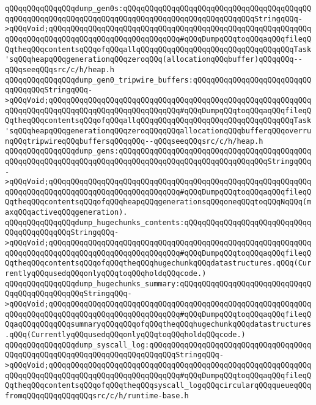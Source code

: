 \verb|qQQqqQQqqQQqqQQqdump_gen0s:qQQqqQQqqQQqqQQqqQQqqQQqqQQqqQQqqQQqqQQqqQQqqQQqqQQqqQQqqQQqqQQqqQQqqQQqqQQqqQQqqQQqqQQqqQQqqQQqqQQqStringqQQq->qQQqVoid;qQQqqQQqqQQqqQQqqQQqqQQqqQQqqQQqqQQqqQQqqQQqqQQqqQQqqQQqqQQqqQQqqQQqqQQqqQQqqQQqqQQqqQQqqQQqqQQqqQQq#qQQqDumpqQQqtoqQQqaqQQqfileqQQqtheqQQqcontentsqQQqofqQQqallqQQqqQQqqQQqqQQqqQQqqQQqqQQqqQQqqQQqTask'sqQQqheapqQQqgenerationqQQqzeroqQQq(allocationqQQqbuffer)qQQqqQQq--qQQqseeqQQqsrc/c/h/heap.h|\newline
\verb|qQQqqQQqqQQqqQQqdump_gen0_tripwire_buffers:qQQqqQQqqQQqqQQqqQQqqQQqqQQqqQQqqQQqStringqQQq->qQQqVoid;qQQqqQQqqQQqqQQqqQQqqQQqqQQqqQQqqQQqqQQqqQQqqQQqqQQqqQQqqQQqqQQqqQQqqQQqqQQqqQQqqQQqqQQqqQQqqQQqqQQq#qQQqDumpqQQqtoqQQqaqQQqfileqQQqtheqQQqcontentsqQQqofqQQqallqQQqqQQqqQQqqQQqqQQqqQQqqQQqqQQqqQQqTask'sqQQqheapqQQqgenerationqQQqzeroqQQqqQQqallocationqQQqbufferqQQqoverrunqQQqtripwireqQQqbuffersqQQqqQQq--qQQqseeqQQqsrc/c/h/heap.h|\newline
\verb|qQQqqQQqqQQqqQQqdump_gens:qQQqqQQqqQQqqQQqqQQqqQQqqQQqqQQqqQQqqQQqqQQqqQQqqQQqqQQqqQQqqQQqqQQqqQQqqQQqqQQqqQQqqQQqqQQqqQQqqQQqqQQqStringqQQq->qQQqVoid;qQQqqQQqqQQqqQQqqQQqqQQqqQQqqQQqqQQqqQQqqQQqqQQqqQQqqQQqqQQqqQQqqQQqqQQqqQQqqQQqqQQqqQQqqQQqqQQqqQQq#qQQqDumpqQQqtoqQQqaqQQqfileqQQqtheqQQqcontentsqQQqofqQQqheapqQQqgenerationsqQQqoneqQQqtoqQQqNqQQq(maxqQQqactiveqQQqgeneration).|\newline
\verb|qQQqqQQqqQQqqQQqdump_hugechunks_contents:qQQqqQQqqQQqqQQqqQQqqQQqqQQqqQQqqQQqqQQqqQQqStringqQQq->qQQqVoid;qQQqqQQqqQQqqQQqqQQqqQQqqQQqqQQqqQQqqQQqqQQqqQQqqQQqqQQqqQQqqQQqqQQqqQQqqQQqqQQqqQQqqQQqqQQqqQQqqQQq#qQQqDumpqQQqtoqQQqaqQQqfileqQQqtheqQQqcontentsqQQqofqQQqtheqQQqhugechunkqQQqdatastructures.qQQq(CurrentlyqQQqusedqQQqonlyqQQqtoqQQqholdqQQqcode.)|\newline
\verb|qQQqqQQqqQQqqQQqdump_hugechunks_summary:qQQqqQQqqQQqqQQqqQQqqQQqqQQqqQQqqQQqqQQqqQQqqQQqStringqQQq->qQQqVoid;qQQqqQQqqQQqqQQqqQQqqQQqqQQqqQQqqQQqqQQqqQQqqQQqqQQqqQQqqQQqqQQqqQQqqQQqqQQqqQQqqQQqqQQqqQQqqQQqqQQq#qQQqDumpqQQqtoqQQqaqQQqfileqQQqaqQQqqQQqqQQqsummaryqQQqqQQqofqQQqtheqQQqhugechunkqQQqdatastructures.qQQq(CurrentlyqQQqusedqQQqonlyqQQqtoqQQqholdqQQqcode.)|\newline
\verb|qQQqqQQqqQQqqQQqdump_syscall_log:qQQqqQQqqQQqqQQqqQQqqQQqqQQqqQQqqQQqqQQqqQQqqQQqqQQqqQQqqQQqqQQqqQQqqQQqqQQqStringqQQq->qQQqVoid;qQQqqQQqqQQqqQQqqQQqqQQqqQQqqQQqqQQqqQQqqQQqqQQqqQQqqQQqqQQqqQQqqQQqqQQqqQQqqQQqqQQqqQQqqQQqqQQqqQQq#qQQqDumpqQQqtoqQQqaqQQqfileqQQqtheqQQqcontentsqQQqofqQQqtheqQQqsyscall_logqQQqcircularqQQqqueueqQQqfromqQQqqQQqqQQqqQQqsrc/c/h/runtime-base.h|\newline
